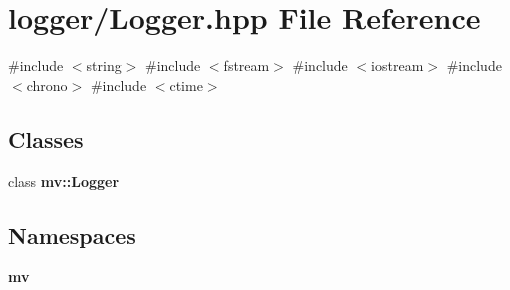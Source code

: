 \section{logger/\+Logger.hpp File Reference}
\label{_logger_8hpp}
{\ttfamily \#include $<$string$>$}\newline
{\ttfamily \#include $<$fstream$>$}\newline
{\ttfamily \#include $<$iostream$>$}\newline
{\ttfamily \#include $<$chrono$>$}\newline
{\ttfamily \#include $<$ctime$>$}\newline
\subsection*{Classes}
\begin{DoxyCompactItemize}
\item 
class \textbf{ mv\+::\+Logger}
\end{DoxyCompactItemize}
\subsection*{Namespaces}
\begin{DoxyCompactItemize}
\item 
 \textbf{ mv}
\end{DoxyCompactItemize}
